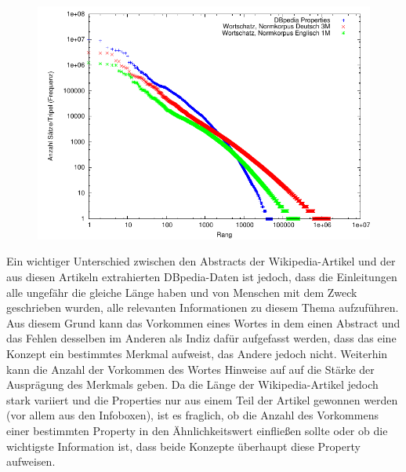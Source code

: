 
\begin{figure}[tbh]
\includegraphics[width=\textwidth]{img/pdf/zipf_wortschatz_properties_reduced.pdf}
\label{fig:zipf_wortschatz_properties}
\end{figure}




Ein wichtiger Unterschied zwischen den Abstracts der Wikipedia-Artikel und der aus diesen Artikeln extrahierten DBpedia-Daten ist jedoch, dass
die Einleitungen alle ungefähr die gleiche Länge haben und von Menschen mit dem Zweck geschrieben wurden, alle relevanten Informationen zu diesem Thema aufzuführen.
Aus diesem Grund kann das Vorkommen eines Wortes in dem einen Abstract und das Fehlen desselben im Anderen als Indiz dafür aufgefasst werden, dass das eine Konzept ein bestimmtes Merkmal aufweist,
das Andere jedoch nicht. Weiterhin kann die Anzahl der Vorkommen des Wortes Hinweise auf auf die Stärke der Ausprägung des Merkmals geben.
Da die Länge der Wikipedia-Artikel jedoch stark variiert und die Properties nur aus einem Teil der Artikel gewonnen werden (vor allem aus den Infoboxen), ist es fraglich, ob die Anzahl des Vorkommens
einer bestimmten Property in den Ähnlichkeitswert einfließen sollte oder ob die wichtigste Information ist, dass beide Konzepte überhaupt diese Property aufweisen.

